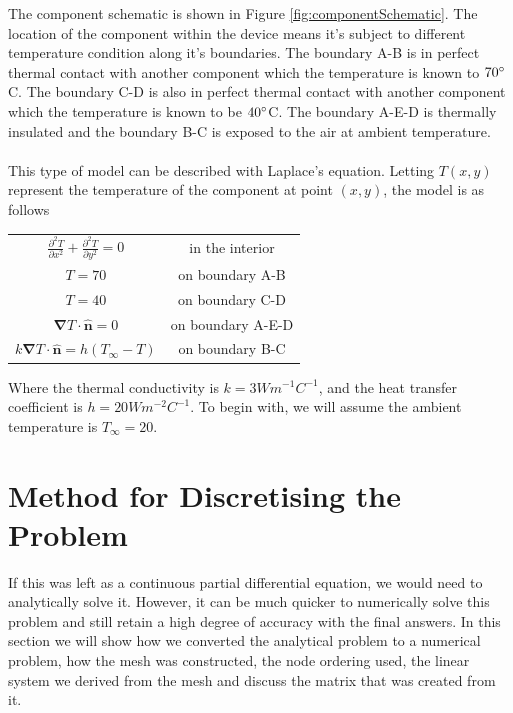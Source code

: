 \documentclass[12pt,a4paper]{article}
\begin{document}
The component schematic is shown in Figure \ref{fig:componentSchematic}. The location of the component within the device means it's subject to different temperature condition along it's boundaries. The boundary A-B is in perfect thermal contact with another component which the temperature is known to $70\degree$C. The boundary C-D is also in perfect thermal contact with another component which the temperature is known to be $40\degree$C. The boundary A-E-D is thermally insulated and the boundary B-C is exposed to the air at ambient temperature.
\\\\
This type of model can be described with Laplace's equation. Letting $T(x,y)$ represent the temperature of the component at point $(x, y)$, the model is as follows	

\begin{center}
\begin{tabular}{c c}
$\frac{\partial^2 T}{\partial x^2}+\frac{\partial^2 T}{\partial y^2}=0$ & in the interior\\
$T = 70$ & on boundary A-B \\
$T = 40$ & on boundary C-D \\
$\boldsymbol{\nabla} T \cdot {\hat{\textbf{n}}} = 0$ & on boundary A-E-D\\
$k\boldsymbol{\nabla}T\cdot\hat{\textbf{n}} = h(T_{\infty} - T)$ & on boundary B-C
\end{tabular}
\end{center}
Where the thermal conductivity is $k=3Wm^{-1}C^{-1}$, and the heat transfer coefficient is $h=20 Wm^{-2}C^{-1}$. To begin with, we will assume the ambient temperature is $T_\infty = 20$.
\clearpage
\section{Method for Discretising the Problem}
If this was left as a continuous partial differential equation, we would need to analytically solve it. However, it can be much quicker to numerically solve this problem and still retain a high degree of accuracy with the final answers. In this section we will show how we converted the analytical problem to a numerical problem, how the mesh was constructed, the node ordering used, the linear system we derived from the mesh and discuss the matrix that was created from it.
\end{document}

